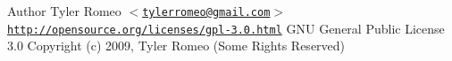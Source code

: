 \begin{DoxyAuthor}{Author}
Tyler Romeo $<$\href{mailto:tylerromeo@gmail.com}{\tt tylerromeo@gmail.com}$>$  \href{http://opensource.org/licenses/gpl-3.0.html}{\tt http://opensource.org/licenses/gpl-\/3.0.html} GNU General Public License 3.0  Copyright (c) 2009, Tyler Romeo (Some Rights Reserved) 
\end{DoxyAuthor}
